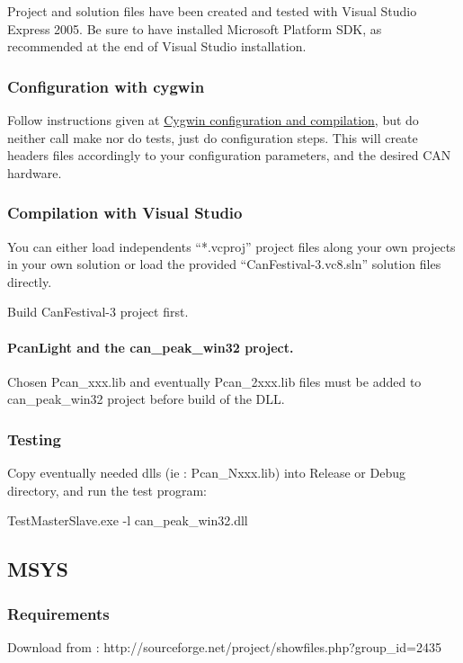 \documentclass[a4paper,12pt]{book}
\begin{document}
Project and solution files have been created and tested with Visual
Studio Express 2005. Be sure to have installed Microsoft Platform SDK,
as recommended at the end of Visual Studio installation.

\subsubsection{Configuration with cygwin}
Follow instructions given at 
\hyperlink{Cygwin configuration and compilation}{Cygwin
configuration and compilation}, but do neither call make nor do tests,
just do configuration steps. This will create headers files accordingly
to your configuration parameters, and the desired CAN hardware.

\subsubsection{Compilation with Visual Studio}
You can either load independents ``*.vcproj'' project files along your
own projects in your own solution or load the provided
``CanFestival{}-3.vc8.sln'' solution files directly.

Build CanFestival{}-3 project first.

\paragraph{PcanLight and the can\_peak\_win32 project.}
Chosen Pcan\_xxx.lib and eventually Pcan\_2xxx.lib files must be added
to can\_peak\_win32 \space \space project before build of the DLL.

\subsubsection{Testing}
Copy eventually needed dlls (ie : Pcan\_Nxxx.lib) into Release or Debug
directory, and run the test program:

{\ttfamily
TestMasterSlave.exe {}-l can\_peak\_win32.dll}

\subsection{MSYS}


\subsubsection{Requirements}

Download from : http://sourceforge.net/project/showfiles.php?group\_id=2435
\end{document}
